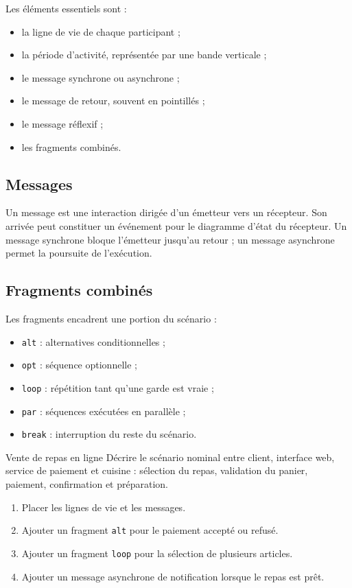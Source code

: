 Les éléments essentiels sont :
\begin{itemize}
  \item la ligne de vie de chaque participant ;
  \item la période d'activité, représentée par une bande verticale ;
  \item le message synchrone ou asynchrone ;
  \item le message de retour, souvent en pointillés ;
  \item le message réflexif ;
  \item les fragments combinés.
\end{itemize}

\subsection{Messages}

Un message est une interaction dirigée d'un émetteur vers un récepteur. Son arrivée peut constituer un événement pour le diagramme d'état du récepteur. Un message synchrone bloque l'émetteur jusqu'au retour ; un message asynchrone permet la poursuite de l'exécution.

\subsection{Fragments combinés}

Les fragments encadrent une portion du scénario :
\begin{itemize}
  \item \texttt{alt} : alternatives conditionnelles ;
  \item \texttt{opt} : séquence optionnelle ;
  \item \texttt{loop} : répétition tant qu'une garde est vraie ;
  \item \texttt{par} : séquences exécutées en parallèle ;
  \item \texttt{break} : interruption du reste du scénario.
\end{itemize}

\begin{center}\TLFragmentsSequence\end{center}

\begin{TLLogicApplication}{Vente de repas en ligne}
Décrire le scénario nominal entre client, interface web, service de paiement et cuisine : sélection du repas, validation du panier, paiement, confirmation et préparation.
\begin{enumerate}
  \item Placer les lignes de vie et les messages.
  \item Ajouter un fragment \texttt{alt} pour le paiement accepté ou refusé.
  \item Ajouter un fragment \texttt{loop} pour la sélection de plusieurs articles.
  \item Ajouter un message asynchrone de notification lorsque le repas est prêt.
\end{enumerate}
\end{TLLogicApplication}
